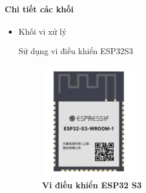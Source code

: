 \documentclass{article} %
\begin{document}
	\paragraph{Chi tiết các khối}\mbox{}
	\begin{itemize}
		
		\item  Khối vi xử lý
		
		Sử dụng vi điều khiển ESP32S3 
		\begin{figure}[!ht]
			\centering
			\includegraphics[width=4.2cm,height=5cm]{Images/ESP32S3.png}
			\caption[Vi điều khiển ESP32 S3\cite{esp32s3} ]{\bfseries \fontsize{12pt}{0pt}\selectfont Vi điều khiển ESP32 S3\cite{esp32s3} }
			\label{ESP32S3}
		\end{figure}
		

\end{itemize}
\end{document}

